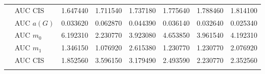 \begin{table}[htbp]
\begin{tabular}{llrrrrrr}
    & AUC CIS & 1.647440 & 1.711540 & 1.737180 & 1.775640 & 1.788460 & 1.814100 \\
    \addlinespace
    \multirow{4}{*}{random} & AUC $a(G)$ & 0.033620 & 0.062870 & 0.044390 & 0.036140 & 0.032640 & 0.025340 \\
    & AUC $m_0$ & 6.192310 & 2.230770 & 3.923080 & 4.653850 & 3.961540 & 4.192310 \\
    & AUC $m_1$ & 1.346150 & 1.076920 & 2.615380 & 1.230770 & 1.230770 & 2.076920 \\
    & AUC CIS & 1.852560 & 3.596150 & 3.179490 & 2.493590 & 2.230770 & 2.352560 \\
    \addlinespace
    \bottomrule
  \end{tabular}
\end{table}

